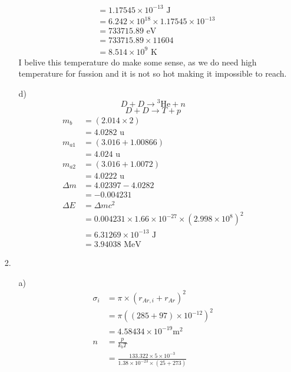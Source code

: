 \documentclass{article}
\begin{document}
\begin{itemize}
\begin{itemize}
\begin{align*}
            \\ &=1.17545\times 10^{-13} \text{ J}\\
            &=6.242\times 10^{18}\times 1.17545\times 10^{-13}\\
            &=733715.89 \text{ eV}\\
            &=733715.89\times 11604\\
            &=8.514\times 10^9 \text{ K}
        \end{align*}
        I belive this temperature do make some sense, as we do need high temperature for fussion and it is not so hot making it impossible to reach.
        \item [d)]
        \[D+D\rightarrow {}^3\text{He}+n\]
        \[D+D\rightarrow T+p\]
        \begin{align*}
            m_b &=(2.014\times 2)\\
            &=4.0282 \text { u}\\
            m_{a1} &= (3.016+1.00866)\\
            &=4.024 \text{ u}\\
            m_{a2} &=(3.016+1.0072)\\
            &=4.0222 \text{ u}\\
            \Delta m &= 4.02397-4.0282\\
            &=-0.004231\\
            \Delta E &= \Delta mc^2\\
            &=0.004231\times 1.66\times 10^{-27}\times (2.998\times 10^8)^2\\
            &=6.31269\times 10^{-13} \text{ J}\\
            &=3.94038 \text{ MeV}
        \end{align*}
    \end{itemize}
    \newpage
    \item [2.]
    \begin{itemize}
        \item [a)]
        \begin{align*}
            \sigma_i &= \pi\times (r_{Ar,i}+r_{Ar})^2\\
            &=\pi((285+97)\times 10^{-12})^2\\
            &=4.58434\times 10^{-19} \text{m}^2\\
            n &=\frac{p}{k_bT}\\
            &=\frac{133.322\times 5\times10^{-3}}{1.38\times 10^{-23}\times(25+273)}\\

\end{align*}
\end{itemize}
\end{itemize}
\end{document}
